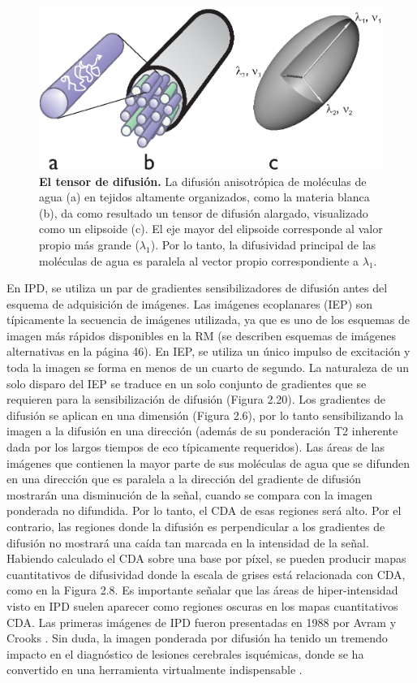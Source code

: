 \documentclass[12pt,a5,twoside]{book}
\begin{document}
\begin{figure}
	\centering
    \includegraphics [scale=1,center] {DTI_ellipsoid.eps}
    \caption{\textbf{El tensor de difusión.} La difusión anisotrópica de moléculas de agua (a) en tejidos altamente organizados, como la materia blanca (b), da como resultado un tensor de difusión alargado, visualizado como un elipsoide (c). El eje mayor del elipsoide corresponde al valor propio más grande ($\lambda_1$). Por lo tanto, la difusividad principal de las moléculas de agua es paralela al vector propio correspondiente a $\lambda_1$.}
    \label{F:DTI_ellipsoid}
\end{figure}

En IPD, se utiliza un par de gradientes sensibilizadores de difusión antes del esquema de adquisición de imágenes. Las imágenes ecoplanares (IEP) \citep{Mansfield_1977,Ordidge_1988} son típicamente la secuencia de imágenes utilizada, ya que es uno de los esquemas de imagen más rápidos disponibles en la RM (se describen esquemas de imágenes alternativas en la página 46). En IEP, se utiliza un único impulso de excitación y toda la imagen se forma en menos de un cuarto de segundo. La naturaleza de un solo disparo del IEP se traduce en un solo conjunto de gradientes que se requieren para la sensibilización de difusión (Figura 2.20). Los gradientes de difusión se aplican en una dimensión (Figura 2.6), por lo tanto sensibilizando la imagen a la difusión en una dirección (además de su ponderación T2 inherente dada por los largos tiempos de eco típicamente requeridos). Las áreas de las imágenes que contienen la mayor parte de sus moléculas de agua que se difunden en una dirección que es paralela a la dirección del gradiente de difusión mostrarán una disminución de la señal, cuando se compara con la imagen ponderada no difundida. Por lo tanto, el CDA de esas regiones será alto. Por el contrario, las regiones donde la difusión es perpendicular a los gradientes de difusión no mostrará una caída tan marcada en la intensidad de la señal. Habiendo calculado el CDA sobre una base por píxel, se pueden producir mapas cuantitativos de difusividad donde la escala de grises está relacionada con CDA, como en la Figura 2.8. Es importante señalar que las áreas de hiper-intensidad visto en IPD suelen aparecer como regiones oscuras en los mapas cuantitativos CDA. Las primeras imágenes de IPD fueron presentadas en 1988 por Avram y Crooks \citep{Avram_1988}. Sin duda, la imagen ponderada por difusión ha tenido un tremendo impacto en el diagnóstico de lesiones cerebrales isquémicas, donde se ha convertido en una herramienta virtualmente indispensable \citep{Sotak_2002,Moseley_1990,Warach_1995}.\\
\end{document}
